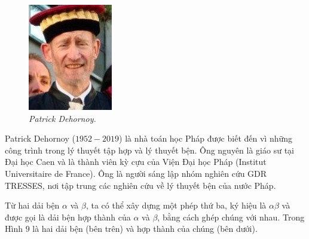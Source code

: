 \begin{multicols}{2}
\begin{tBox}
		\begin{figure}
			\vspace*{-15pt}
			\centering
			\captionsetup{labelformat= empty, justification=centering}
			\hspace*{-13pt}\includegraphics[width= 1.05\linewidth]{fig_Dehornoy}
			\hspace*{-13pt}\caption{\small\textit{\color{duongvaotoanhoc}Patrick Dehornoy.}}
			\vspace*{-10pt}
		\end{figure}
		Patrick Dehornoy ($1952-2019$) là nhà toán học Pháp được biết đến vì những công trình trong lý thuyết tập hợp và lý thuyết bện. Ông nguyên là giáo sư tại Đại học Caen và là thành viên kỳ cựu của Viện Đại học Pháp (Institut Universitaire de France). Ông là người sáng lập nhóm nghiên cứu GDR TRESSES, nơi tập trung các nghiên cứu về lý thuyết bện của nước Pháp.
	\end{tBox}
	Từ hai dải bện $\alpha$ và $\beta$, ta có thể xây dựng một phép thứ ba, ký hiệu là $\alpha \beta$ và được gọi là dải bện hợp thành của $\alpha$ và $\beta$, bằng cách ghép chúng với nhau. Trong Hình $9$ là hai dải bện (bên trên) và hợp thành của chúng (bên dưới).

\end{multicols}
